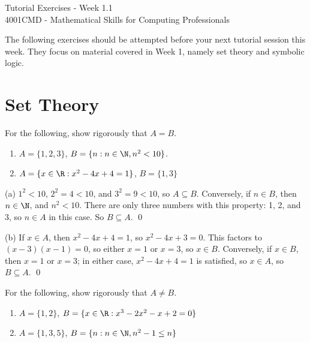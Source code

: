 \documentclass[a4paper,12pt]{article}
\begin{document}
\begin{center}
\Large{Tutorial Exercises - Week 1.1} \\
\vspace{3mm}
\large{4001CMD - Mathematical Skills for Computing Professionals} \\
\vspace{5mm}
\end{center}

The following exercises should be attempted before your next tutorial session this week. They focus on material covered in Week 1, namely set theory and symbolic logic. 

\section*{Set Theory}

\begin{problem}
	For the following, show rigorously that $A = B$. 
	\begin{enumerate}[label=(\alph*)]
		\item $A = \{1,2,3\}$, $B = \{n : n \in \N, n^2 < 10\}$. 
		\item $A = \{x \in \R: x^2 - 4x + 4 = 1\}$, $B = \{1,3\}$
	\end{enumerate}
\end{problem}

\begin{solution}
	(a) $1^2 < 10$, $2^2 = 4 < 10$, and $3^2 = 9 < 10$, so $A \subseteq B$. Conversely, if $n \in B$, then $n \in \N$, and $n^2 < 10$. There are only three numbers with this property: 1, 2, and 3, so $n \in A$ in this case. So $B \subseteq A$. \qed
	
	(b) If $x \in A$, then $x^2 - 4x + 4 = 1$, so $x^2 - 4x + 3 = 0$. This factors to $(x - 3)(x-1) = 0$, so either $x=1$ or $x=3$, so $x \in B$. Conversely, if $x \in B$, then $x = 1$ or $x=3$; in either case, $x^2 - 4x + 4 = 1$ is satisfied, so $x \in A$, so $B \subseteq A$. \qed
\end{solution}

\begin{problem}
	For the following, show rigorously that $A \neq B$. 
	\begin{enumerate}[label=(\alph*)]
		\item $A = \{1,2\}$, $B=\{x \in \R : x^3 - 2x^2 - x + 2 = 0\}$
		\item $A = \{1,3,5\}$, $B = \{n : n \in \N, n^2 - 1 \leq n\}$
	\end{enumerate}
\end{problem}
\end{document}
